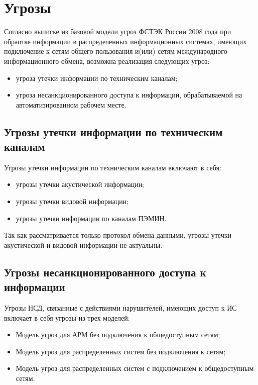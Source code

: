 \newpage
\section{Угрозы}
\setcounter{figure}{0}

Согласно выписке из базовой модели угроз ФСТЭК России 2008 года \cite{threats} при обраотке информации в распределенных информационных системах, имеющих подключение к сетям общего пользования и(или) сетям международного информационного обмена, возможна реализация следующих угроз:

\begin{itemize}
 \item угроза утечки информации по техническим каналам;
 \item угроза несанкционированного доступа к информации, обрабатываемой на автоматизированном рабочем месте.
\end{itemize}

\subsection{Угрозы утечки информации по техническим каналам}

Угрозы утечки информации по техническим каналам включают в себя:

\begin{itemize}
 \item угрозы утечки акустической информации;
 \item угрозы утечки видовой информации;
 \item угрозы утечки информации по каналам ПЭМИН.
\end{itemize}

Так как рассматривается только протокол обмена данными, угрозы утечки акустической и видовой информации не актуальны.

\subsection{Угрозы несанкционированного доступа к информации}

Угрозы НСД, связанные с действиями нарушителей, имеющих доступ к ИС включает в себя угрозы из трех моделей:

\begin{itemize}
 \item Модель угроз для АРМ без подключения к общедоступным сетям;
 \item Модель угроз для распределенных систем без подключения к сетям;
 \item Модель угроз для распределенных систем с подключением к общедоступным сетям.
\end{itemize}

